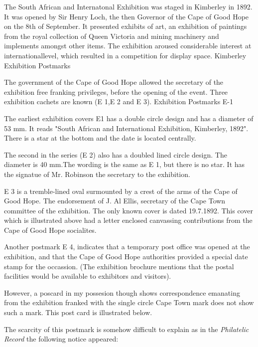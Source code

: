  

The South African and Internatonal Exhibition was staged in Kimberley 
in 1892. It was opened by Sir Henry Loch, the then Governor of 
the Cape of Good Hope on the 8th of September. It presented 
exhibits of art, an exhibition of paintings from the royal 
collection of Queen Victoria and mining machinery and implements 
amongst other items. The exhibition aroused considerable interest 
at internationallevel, which resulted in a competition for display space.
Kimberley Exhibition Postmarks

The government of the Cape of Good Hope allowed the secretary of the
exhibition free franking privileges, before the opening of the event. 
Three exhibition cachets are known (E 1,E 2 and E 3).
Exhibition Postmarks E-1
 

The earliest exhibition covers E1 has a double circle design and 
has a diameter of 53 mm. It reads "South African and International 
Exhibition, Kimberley, 1892". There is a star at the bottom and the 
date is located centrally.

The second in the series (E 2) also has a doubled lined circle design. 
The diameter is 40 mm.The wording is the same as E 1, 
but there is no star. It has the signatue of Mr. Robinson the 
secretary to the exhibition.

E 3 is a tremble-lined oval surmounted by a crest of the arms 
of the Cape of Good Hope. The endorsement of J. Al Ellis, 
secretary of the Cape Town committee of the exhibition. The only known 
cover is dated 19.7.1892. This cover which is illustrated 
above had a letter enclosed canvassing contributions from the 
Cape of Good Hope socialites.

Another postmark E 4, indicates that a temporary post office 
was opened at the exhibition, and that the Cape of Good Hope 
authorities provided a special date stamp for the occassion. 
(The exhibition brochure mentions that the postal facilities 
would be available to exhibitors and visitors).

However, a poscard in my possesion though shows correspondence 
emanating from the exhibition franked with the single circle 
Cape Town mark does not show such a mark. This post card is illustrated below.



The scarcity of this postmark is somehow difficult to explain as in the 
\textit{Philatelic Record} the following notice
appeared:

